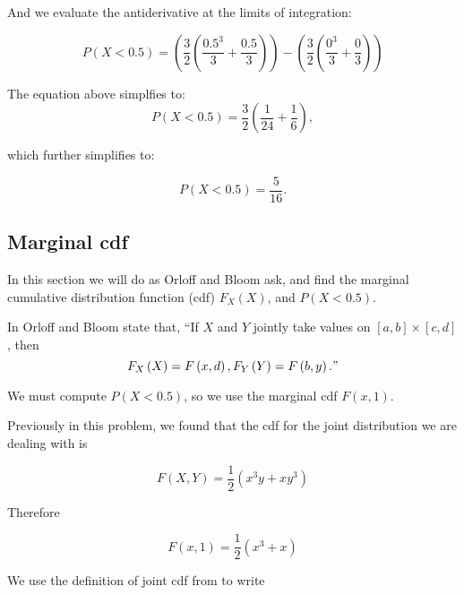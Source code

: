\documentclass[a4paper,11pt]{article}
\begin{document}
And we evaluate the antiderivative at the limits of integration:

\begin{equation}
  P \left( X < 0.5 \right) =
   \left( \frac{3}{2} \left( \frac{0.5^3}{3} + \frac{0.5}{3} \right) \right)
   - \left( \frac{3}{2} \left( \frac{0^3}{3} + \frac{0}{3} \right) \right)
\end{equation}

The equation above simplfies to:
\begin{equation}
  P \left( X < 0.5 \right) =
   \frac{3}{2} \left( \frac{1}{24} + \frac{1}{6} \right),
\end{equation}

which further simplifies to:

\begin{equation}
  P \left( X < 0.5 \right) = \frac{5}{16}.
\end{equation}


\subsection{Marginal cdf}

In this section we will do as Orloff and Bloom ask, and find the marginal
cumulative distribution function (cdf) $F_{X}\left(X \right)$, and
$P\left(X < 0.5 \right)$.

In \cite{reading7} Orloff and Bloom state that, ``If $X$ and $Y$ jointly take
values on $\left[a,b\right] \times \left[c, d \right]$, then
\begin{equation}
  F_{X}\left(X \right) = F\left(x, d\right),
  F_{Y} \left(Y \right) = F \left(b, y \right)."
\end{equation}

We must compute $P\left( X < 0.5 \right)$, so we use the marginal cdf
$F\left(x, 1 \right)$.

Previously in this problem, we found that the cdf for the joint distribution
we are dealing with is

\begin{equation}
F\left( X, Y \right) =  \frac{1}{2}\left( x^{3}y + xy^3  \right)
\end{equation}

Therefore

\begin{equation}\label{marginCdf}
  F\left(x, 1 \right) = \frac{1}{2}\left( x^{3} + x  \right)
\end{equation}

We use the definition of joint cdf from \cite{reading7} to write
\end{document}
